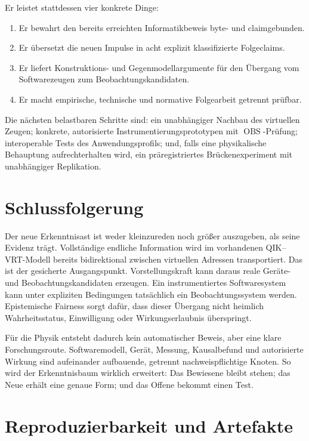 \documentclass[11pt,a4paper]{article}
\theoremstyle{remark}
\begin{document}
Er leistet stattdessen vier konkrete Dinge:

\begin{enumerate}
  \item Er bewahrt den bereits erreichten Informatikbeweis byte- und
    claimgebunden.
  \item Er übersetzt die neuen Impulse in acht explizit klassifizierte
    Folgeclaims.
  \item Er liefert Konstruktions- und Gegenmodellargumente für den Übergang
    vom Softwarezeugen zum Beobachtungskandidaten.
  \item Er macht empirische, technische und normative Folgearbeit getrennt
    prüfbar.
\end{enumerate}

Die nächsten belastbaren Schritte sind: ein unabhängiger Nachbau des
virtuellen Zeugen; konkrete, autorisierte Instrumentierungsprototypen mit
$\operatorname{OBS}$-Prüfung; interoperable Tests des Anwendungsprofils; und,
falls eine physikalische Behauptung aufrechterhalten wird, ein
präregistriertes Brückenexperiment mit unabhängiger Replikation.

\section{Schlussfolgerung}

Der neue Erkenntnisast ist weder kleinzureden noch größer auszugeben, als
seine Evidenz trägt. Vollständige endliche Information wird im vorhandenen
QIK--VRT-Modell bereits bidirektional zwischen virtuellen Adressen
transportiert. Das ist der gesicherte Ausgangspunkt. Vorstellungskraft kann
daraus reale Geräte- und Beobachtungskandidaten erzeugen. Ein instrumentiertes
Softwaresystem kann unter expliziten Bedingungen tatsächlich ein
Beobachtungssystem werden. Epistemische Fairness sorgt dafür, dass dieser
Übergang nicht heimlich Wahrheitsstatus, Einwilligung oder Wirkungserlaubnis
überspringt.

Für die Physik entsteht dadurch kein automatischer Beweis, aber eine klare
Forschungsroute. Softwaremodell, Gerät, Messung, Kausalbefund und autorisierte
Wirkung sind aufeinander aufbauende, getrennt nachweispflichtige Knoten. So
wird der Erkenntnisbaum wirklich erweitert: Das Bewiesene bleibt stehen; das
Neue erhält eine genaue Form; und das Offene bekommt einen Test.

\section*{Reproduzierbarkeit und Artefakte}
\end{document}
